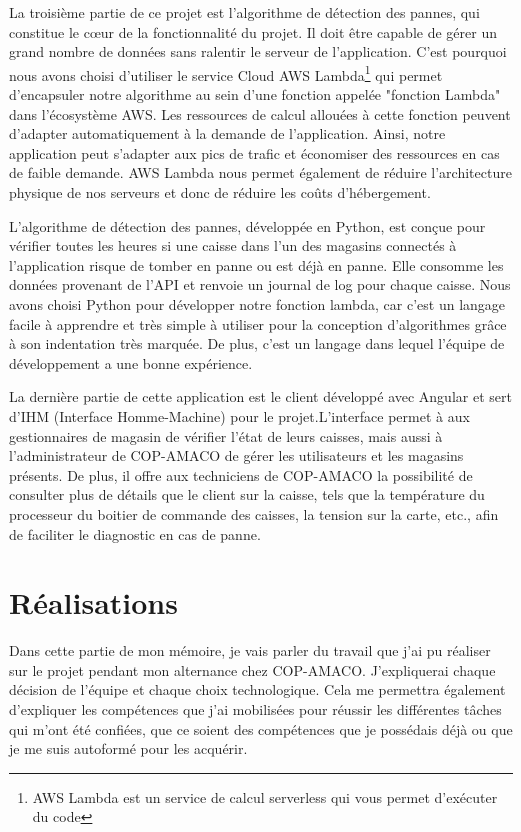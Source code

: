\documentclass[12pt]{article}
\begin{document}
\justify
\text La troisième partie de ce projet est l'algorithme de détection des pannes, qui constitue le cœur de la fonctionnalité du projet. Il doit être capable de gérer un grand nombre de données sans ralentir le serveur de l'application. C'est pourquoi nous avons choisi d'utiliser le service Cloud AWS Lambda\footnote{AWS Lambda est un service de calcul serverless qui vous permet d'exécuter du code} qui permet d'encapsuler notre algorithme au sein d'une fonction appelée "fonction Lambda" dans l'écosystème AWS. Les ressources de calcul allouées à cette fonction peuvent d'adapter automatiquement à la demande de l'application. Ainsi, notre application peut s'adapter aux pics de trafic et économiser des ressources en cas de faible demande. AWS Lambda nous permet également de réduire l'architecture physique de nos serveurs et donc de réduire les coûts d'hébergement.

\justify
\text L'algorithme de détection des pannes, développée en Python, est conçue pour vérifier toutes les heures si une caisse dans l'un des magasins connectés à l'application risque de tomber en panne ou est déjà en panne. Elle consomme les données provenant de l'API et renvoie un journal de log pour chaque caisse.
\justify
\text Nous avons choisi Python pour développer notre fonction lambda, car c'est un langage facile à apprendre et très simple à utiliser pour la conception d'algorithmes grâce à son indentation très marquée. De plus, c'est un langage dans lequel l'équipe de développement a une bonne expérience.

\justify
\text La dernière partie de cette application est le client développé avec Angular et sert d'IHM (Interface Homme-Machine) pour le projet.L'interface permet à aux gestionnaires de magasin de vérifier l'état de leurs caisses, mais aussi à l'administrateur de COP-AMACO de gérer les utilisateurs et les magasins présents. De plus, il offre aux techniciens de COP-AMACO la possibilité de consulter plus de détails que le client sur la caisse, tels que la température du processeur du boitier de commande des caisses, la tension sur la carte, etc., afin de faciliter le diagnostic en cas de panne.  


\newpage
\section {Réalisations}

\text Dans cette partie de mon mémoire, je vais parler du travail que j'ai pu réaliser sur le projet pendant mon alternance chez COP-AMACO. J'expliquerai chaque décision de l'équipe et chaque choix technologique. Cela me permettra également d'expliquer les compétences que j'ai mobilisées pour réussir les différentes tâches qui m'ont été confiées, que ce soient des compétences que je possédais déjà ou que je me suis autoformé pour les acquérir.
\end{document}

